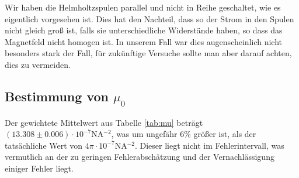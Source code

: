 \documentclass[12pt,a4paper,titlepage,headinclude,bibtotoc]{scrartcl}
\begin{document}
Wir haben die Helmholtzspulen parallel und nicht in Reihe geschaltet, wie es eigentlich vorgesehen ist.
Dies hat den Nachteil, dass so der Strom in den Spulen nicht gleich groß ist, falls sie unterschiedliche Widerstände haben, so dass das Magnetfeld nicht homogen ist.
In unserem Fall war dies augenscheinlich nicht besonders stark der Fall, für zukünftige Versuche sollte man aber darauf achten, dies zu vermeiden.

\subsection{Bestimmung von $\mu_0$}
Der gewichtete Mittelwert aus Tabelle \ref{tab:mu} beträgt  $(13.308\pm 0.006)\cdot 10^{-7}\si{\newton\ampere^{-2}}$, was um ungefähr 6\% größer ist, als der tatsächliche Wert von $4\pi\cdot10^{-7}\si{\newton\ampere^{-2}}$.
Dieser liegt nicht im Fehlerintervall, was vermutlich an der zu geringen Fehlerabschätzung und der Vernachlässigung einiger Fehler liegt.



\end{document}
